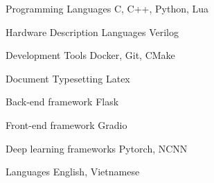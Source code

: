 

\begin{cvskills}




  \cvskill
  {Programming Languages} %
  {C, C++, Python, Lua} %

  \cvskill
  {Hardware Description Languages} %
  {Verilog} %

  \cvskill
  {Development Tools} %
  {Docker, Git, CMake} %

  \cvskill
  {Document Typesetting} %
  {Latex} %

  \cvskill
  {Back-end framework} %
  {Flask} %

  \cvskill
  {Front-end framework} %
  {Gradio} %

  \cvskill
  {Deep learning frameworks} %
  {Pytorch, NCNN} %

  \cvskill
  {Languages} %
  {English, Vietnamese} %

\end{cvskills}
